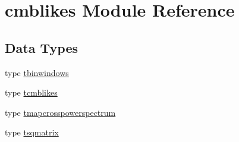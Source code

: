 \hypertarget{namespacecmblikes}{}\section{cmblikes Module Reference}
\label{namespacecmblikes}
\subsection*{Data Types}
\begin{DoxyCompactItemize}
\item 
type \mbox{\hyperlink{structcmblikes_1_1tbinwindows}{tbinwindows}}
\item 
type \mbox{\hyperlink{structcmblikes_1_1tcmblikes}{tcmblikes}}
\item 
type \mbox{\hyperlink{structcmblikes_1_1tmapcrosspowerspectrum}{tmapcrosspowerspectrum}}
\item 
type \mbox{\hyperlink{structcmblikes_1_1tsqmatrix}{tsqmatrix}}
\end{DoxyCompactItemize}
